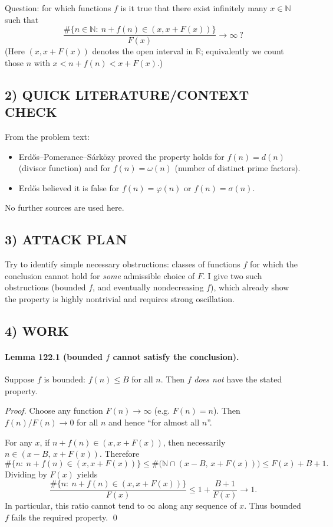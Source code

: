 Question: for which functions $f$ is it true that there exist infinitely many $x\in\mathbb N$ such that
\[
\frac{\#\{n\in\mathbb N:\ n+f(n)\in (x,x+F(x))\}}{F(x)}\to\infty\ ?
\]
(Here $(x,x+F(x))$ denotes the open interval in $\mathbb R$; equivalently we count those $n$ with $x<n+f(n)<x+F(x)$.)

\subsection*{2) QUICK LITERATURE/CONTEXT CHECK}
From the problem text:
\begin{itemize}
\item Erd\H{o}s--Pomerance--S\'ark\"ozy proved the property holds for $f(n)=d(n)$ (divisor function) and for $f(n)=\omega(n)$ (number of distinct prime factors).
\item Erd\H{o}s believed it is false for $f(n)=\varphi(n)$ or $f(n)=\sigma(n)$.
\end{itemize}
No further sources are used here.

\subsection*{3) ATTACK PLAN}
Try to identify simple necessary obstructions: classes of functions $f$ for which the conclusion cannot hold for \emph{some} admissible choice of $F$.  I give two such obstructions (bounded $f$, and eventually nondecreasing $f$), which already show the property is highly nontrivial and requires strong oscillation.

\subsection*{4) WORK}
\paragraph{Lemma 122.1 (bounded $f$ cannot satisfy the conclusion).}
Suppose $f$ is bounded: $f(n)\le B$ for all $n$.  Then $f$ \emph{does not} have the stated property.

\emph{Proof.}
Choose any function $F(n)\to\infty$ (e.g. $F(n)=n$).  Then $f(n)/F(n)\to0$ for all $n$ and hence ``for almost all $n$''.

For any $x$, if $n+f(n)\in (x,x+F(x))$, then necessarily $n\in (x-B,\,x+F(x))$.  Therefore
\[
\#\{n:\ n+f(n)\in(x,x+F(x))\}\le \#\big(\mathbb N\cap(x-B,\,x+F(x))\big)\le F(x)+B+1.
\]
Dividing by $F(x)$ yields
\[
\frac{\#\{n:\ n+f(n)\in(x,x+F(x))\}}{F(x)}\le 1+\frac{B+1}{F(x)}\to 1.
\]
In particular, this ratio cannot tend to $\infty$ along any sequence of $x$.  Thus bounded $f$ fails the required property. \qed


